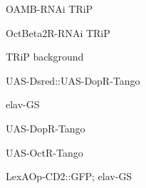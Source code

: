 \documentclass[17pt]{extarticle}
\begin{document}
\footnotesize
\vspace*{\fill}
\newpage{}
\vspace*{\fill}\begin{normalsize}
OAMB-RNAi TRiP \\[0.5em]
\end{normalsize}
\footnotesize
\vspace*{\fill}
\newpage{}
\vspace*{\fill}\begin{small}
OctBeta2R-RNAi TRiP \\[0.5em]
\end{small}
\footnotesize
\vspace*{\fill}
\newpage{}
\vspace*{\fill}\begin{normalsize}
TRiP background \\[0.5em]
\end{normalsize}
\footnotesize
\vspace*{\fill}
\newpage{}
\vspace*{\fill}\begin{footnotesize}
UAS-Dsred::UAS-DopR-Tango \\[0.5em]
\end{footnotesize}
\footnotesize
\vspace*{\fill}
\newpage{}
\vspace*{\fill}\begin{large}
elav-GS \\[0.5em]
\end{large}
\footnotesize
\vspace*{\fill}
\newpage{}
\vspace*{\fill}\begin{normalsize}
UAS-DopR-Tango \\[0.5em]
\end{normalsize}
\footnotesize
\vspace*{\fill}
\newpage{}
\vspace*{\fill}\begin{normalsize}
UAS-OctR-Tango \\[0.5em]
\end{normalsize}
\footnotesize
\vspace*{\fill}
\newpage{}
\vspace*{\fill}\begin{footnotesize}
LexAOp-CD2::GFP; elav-GS \\[0.5em]
\end{footnotesize}
\end{document}
